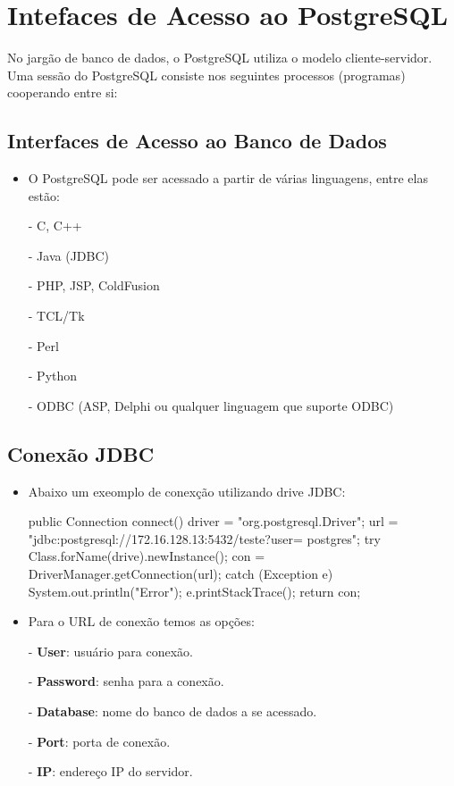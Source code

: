 \newpage \chapter{Intefaces de Acesso ao PostgreSQL}\setcounter{SteP}{1}
    No jargão de banco de dados, o PostgreSQL utiliza o modelo cliente-servidor.
Uma sessão do PostgreSQL consiste nos seguintes processos (programas) cooperando entre si:

\section{Interfaces de Acesso ao Banco de Dados}\setcounter{SteP}{1}

\begin{itemize}
\item{\bf }O PostgreSQL pode ser acessado a partir de várias linguagens, entre elas
estão:

    - C, C++

    - Java (JDBC)

    - PHP, JSP, ColdFusion

    - TCL/Tk

    - Perl

    - Python

    - ODBC (ASP, Delphi ou qualquer linguagem que suporte ODBC)

\end{itemize}

\section{ Conexão JDBC }\setcounter{SteP}{1}

\begin{itemize}
	\item{\bf }Abaixo um exeomplo de conexção utilizando drive JDBC:
\begin{VerbatimNumerado}
	public Connection connect() {
	    driver = "org.postgresql.Driver";
	    url = "jdbc:postgresql://172.16.128.13:5432/teste?user=
	        postgres";
	    try{
	       Class.forName(drive).newInstance();
	       con = DriverManager.getConnection(url);
	   }
	   catch (Exception e){
	       System.out.println("Error");
	       e.printStackTrace();
	   }
           return con;
	}
\end{VerbatimNumerado}
\item{\bf } Para o URL de conexão temos as opções:

	- {\bf User}: usuário para conexão.

	- {\bf Password}: senha para a conexão.

	- {\bf Database}: nome do banco de dados a se acessado.
     
        - {\bf Port}: porta de conexão.

	- {\bf IP}:  endereço IP do servidor.

\end{itemize}


